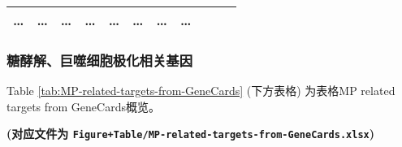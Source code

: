 \documentclass[
]{article}
\begin{document}
\begin{longtable}[]{@{}lllllllllll@{}}
\begin{minipage}[t]{0.07\columnwidth}
\ldots{}\strut
\end{minipage} & \begin{minipage}[t]{0.07\columnwidth}\raggedright
\ldots{}\strut
\end{minipage} & \begin{minipage}[t]{0.07\columnwidth}\raggedright
\ldots{}\strut
\end{minipage} & \begin{minipage}[t]{0.07\columnwidth}\raggedright
\ldots{}\strut
\end{minipage} & \begin{minipage}[t]{0.07\columnwidth}\raggedright
\ldots{}\strut
\end{minipage} & \begin{minipage}[t]{0.09\columnwidth}\raggedright
\ldots{}\strut
\end{minipage} & \begin{minipage}[t]{0.10\columnwidth}\raggedright
\ldots{}\strut
\end{minipage} & \begin{minipage}[t]{0.03\columnwidth}\raggedright
\ldots{}\strut
\end{minipage}\tabularnewline
\bottomrule
\end{longtable}

\hypertarget{ux7cd6ux9175ux89e3ux5de8ux566cux7ec6ux80deux6781ux5316ux76f8ux5173ux57faux56e0}{%
\subsubsection{糖酵解、巨噬细胞极化相关基因}\label{ux7cd6ux9175ux89e3ux5de8ux566cux7ec6ux80deux6781ux5316ux76f8ux5173ux57faux56e0}}

Table \ref{tab:MP-related-targets-from-GeneCards} (下方表格) 为表格MP related targets from GeneCards概览。

\textbf{(对应文件为 \texttt{Figure+Table/MP-related-targets-from-GeneCards.xlsx})}
\end{document}
